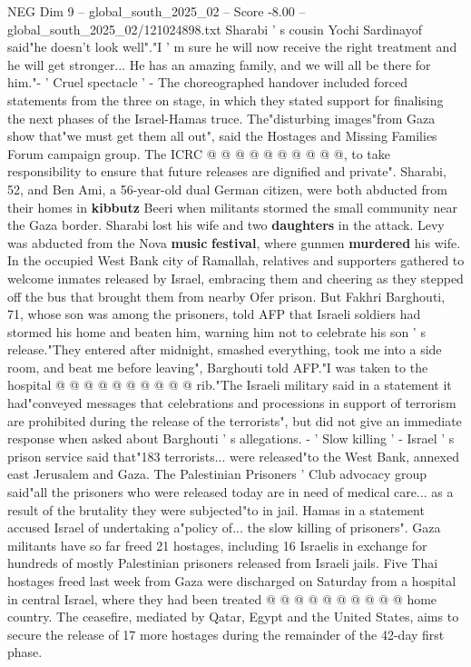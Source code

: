 \begin{textsample}{NEG Dim 9 – global\_south\_2025\_02 – Score -8.00 – global\_south\_2025\_02/121024898.txt}
Sharabi ' s cousin Yochi Sardinayof said"he doesn't look well"."I ' m sure he will now receive the right treatment and he will get stronger...
He has an amazing family, and we will all be there for him."- ' Cruel spectacle ' - The choreographed handover included forced statements from the three on stage, in which they stated support for finalising the next phases of the Israel-Hamas truce.
The"disturbing images"from Gaza show that"we must get them all out", said the Hostages and Missing Families Forum campaign group.
The ICRC @ @ @ @ @ @ @ @ @ @, to take responsibility to ensure that future releases are dignified and private".
Sharabi, 52, and Ben Ami, a 56-year-old dual German citizen, were both abducted from their homes in \textbf{kibbutz} Beeri when militants stormed the small community near the Gaza border.
Sharabi lost his wife and two \textbf{daughters} in the attack.
Levy was abducted from the Nova \textbf{music} \textbf{festival}, where gunmen \textbf{murdered} his wife.
In the occupied West Bank city of Ramallah, relatives and supporters gathered to welcome inmates released by Israel, embracing them and cheering as they stepped off the bus that brought them from nearby Ofer prison.
But Fakhri Barghouti, 71, whose son was among the prisoners, told AFP that Israeli soldiers had stormed his home and beaten him, warning him not to celebrate his son ' s release."They entered after midnight, smashed everything, took me into a side room, and beat me before leaving", Barghouti told AFP."I was taken to the hospital @ @ @ @ @ @ @ @ @ @ rib."The Israeli military said in a statement it had"conveyed messages that celebrations and processions in support of terrorism are prohibited during the release of the terrorists", but did not give an immediate response when asked about Barghouti ' s allegations. - ' Slow killing ' - Israel ' s prison service said that"183 terrorists... were released"to the West Bank, annexed east Jerusalem and Gaza.
The Palestinian Prisoners ' Club advocacy group said"all the prisoners who were released today are in need of medical care... as a result of the brutality they were subjected"to in jail.
Hamas in a statement accused Israel of undertaking a"policy of... the slow killing of prisoners".
Gaza militants have so far freed 21 hostages, including 16 Israelis in exchange for hundreds of mostly Palestinian prisoners released from Israeli jails.
Five Thai hostages freed last week from Gaza were discharged on Saturday from a hospital in central Israel, where they had been treated @ @ @ @ @ @ @ @ @ @ home country.
The ceasefire, mediated by Qatar, Egypt and the United States, aims to secure the release of 17 more hostages during the remainder of the 42-day first phase.

\end{textsample}
